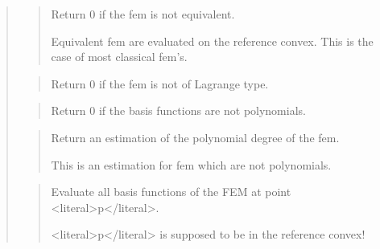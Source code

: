 \documentclass[a4paper,11pt,english]{sphinxmanual}
\begin{document}
\begin{quote}
\sphinxAtStartPar
{}
\begin{quote}

\sphinxAtStartPar
Return 0 if the fem is not equivalent.

\sphinxAtStartPar
Equivalent fem are evaluated on the reference convex. This is
the case of most classical fem’s.
\end{quote}

\sphinxAtStartPar
{}
\begin{quote}

\sphinxAtStartPar
Return 0 if the fem is not of Lagrange type.
\end{quote}

\sphinxAtStartPar
{}
\begin{quote}

\sphinxAtStartPar
Return 0 if the basis functions are not polynomials.
\end{quote}

\sphinxAtStartPar
{}
\begin{quote}

\sphinxAtStartPar
Return an estimation of the polynomial degree of the fem.

\sphinxAtStartPar
This is an estimation for fem which are not polynomials.
\end{quote}

\sphinxAtStartPar
{}
\begin{quote}

\sphinxAtStartPar
Evaluate all basis functions of the FEM at point \textless{}literal\textgreater{}p\textless{}/literal\textgreater{}.

\sphinxAtStartPar
\textless{}literal\textgreater{}p\textless{}/literal\textgreater{} is supposed to be in the reference convex!
\end{quote}

\sphinxAtStartPar
{}
\begin{quote}


\end{quote}
\end{quote}
\end{document}
